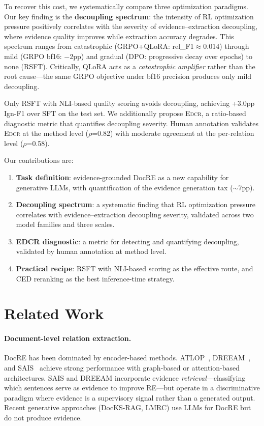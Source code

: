 \documentclass[11pt,a4paper]{article}
\newcommand{\edcr}{\textsc{Edcr}}
\begin{document}
To recover this cost, we systematically compare three optimization paradigms. Our key finding is the \textbf{decoupling spectrum}: the intensity of RL optimization pressure positively correlates with the severity of evidence--extraction decoupling, where evidence quality improves while extraction accuracy degrades. This spectrum ranges from catastrophic (GRPO+QLoRA: rel\_F1$\approx$0.014) through mild (GRPO bf16: $-$2pp) and gradual (DPO: progressive decay over epochs) to none (RSFT). Critically, QLoRA acts as a \emph{catastrophic amplifier} rather than the root cause---the same GRPO objective under bf16 precision produces only mild decoupling.

Only RSFT with NLI-based quality scoring avoids decoupling, achieving +3.0pp Ign-F1 over SFT on the test set. We additionally propose \edcr{}, a ratio-based diagnostic metric that quantifies decoupling severity. Human annotation validates \edcr{} at the method level ($\rho$=0.82) with moderate agreement at the per-relation level ($\rho$=0.58).

Our contributions are:
\begin{enumerate}
\item \textbf{Task definition}: evidence-grounded DocRE as a new capability for generative LLMs, with quantification of the evidence generation tax ($\sim$7pp).
\item \textbf{Decoupling spectrum}: a systematic finding that RL optimization pressure correlates with evidence--extraction decoupling severity, validated across two model families and three scales.
\item \textbf{EDCR diagnostic}: a metric for detecting and quantifying decoupling, validated by human annotation at method level.
\item \textbf{Practical recipe}: RSFT with NLI-based scoring as the effective route, and CED reranking as the best inference-time strategy.
\end{enumerate}

\section{Related Work}
\label{sec:related}

\paragraph{Document-level relation extraction.} DocRE has been dominated by encoder-based methods. ATLOP~\cite{zhou2021atlop}, DREEAM~\cite{ma2023dreeam}, and SAIS~\cite{xiao2022sais} achieve strong performance with graph-based or attention-based architectures. SAIS and DREEAM incorporate evidence \emph{retrieval}---classifying which sentences serve as evidence to improve RE---but operate in a discriminative paradigm where evidence is a supervisory signal rather than a generated output. Recent generative approaches (DocKS-RAG, LMRC) use LLMs for DocRE but do not produce evidence.
\end{document}
